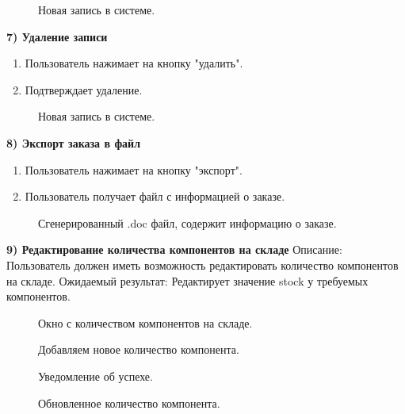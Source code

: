 \begin{figure}[ht]
	\caption{Новая запись в системе.}
	\label{stored:addone1}
\end{figure}

\textbf{7) Удаление записи}
\begin{enumerate}
	\item Пользователь нажимает на кнопку "удалить".
	\item Подтверждает удаление.
\end{enumerate}

\begin{figure}[ht]
	\caption{Новая запись в системе.}
	\label{stored:delete}
\end{figure}

\clearpage

\textbf{8) Экспорт заказа в файл}
\begin{enumerate}
	\item Пользователь нажимает на кнопку "экспорт".
	\item Пользователь получает файл с информацией о заказе.
\end{enumerate}

\begin{figure}[ht]
	\caption{Сгенерированный .doc файл, содержит информацию о заказе.}
	\label{stored:docdoc}
\end{figure}

\textbf{9) Редактирование количества компонентов на складе}
Описание: Пользователь должен иметь возможность редактировать количество компонентов на складе.
Ожидаемый результат: Редактирует значение stock у требуемых компонентов.

\begin{figure}[ht]
	\caption{Окно с количеством компонентов на складе.}
	\label{stored:warehouse0}
\end{figure}

\begin{figure}[ht]
	\caption{Добавляем новое количество компонента.}
	\label{stored:stock0}
\end{figure}

\begin{figure}[ht]
	\caption{Уведомление об успехе.}
	\label{stored:stock1}
\end{figure}

\begin{figure}[ht]
	\caption{Обновленное количество компонента.}
	\label{stored:stock2}
\end{figure}

\clearpage